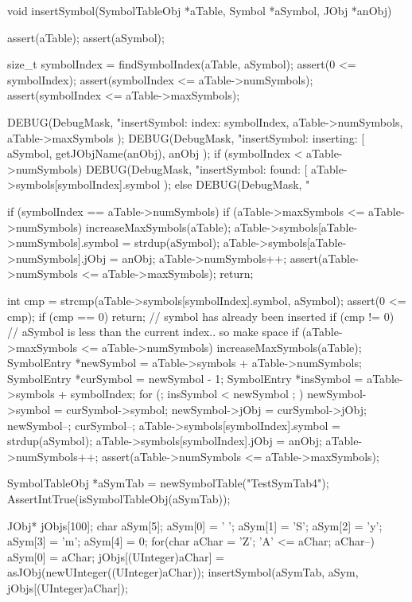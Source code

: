 \startCCode
void insertSymbol(SymbolTableObj *aTable, Symbol *aSymbol, JObj *anObj) {
  assert(aTable);
  assert(aSymbol);
  
  size_t symbolIndex = findSymbolIndex(aTable, aSymbol);
  assert(0 <= symbolIndex);
  assert(symbolIndex <= aTable->numSymbols);
  assert(symbolIndex <= aTable->maxSymbols);
  
  DEBUG(DebugMask,
    "insertSymbol: index: %
    symbolIndex,
    aTable->numSymbols,
    aTable->maxSymbols
  );
  DEBUG(DebugMask,
    "insertSymbol: inserting: [%
    aSymbol,
    getJObjName(anObj),
    anObj
  );
  if (symbolIndex < aTable->numSymbols) {
    DEBUG(DebugMask,
      "insertSymbol: found: [%
      aTable->symbols[symbolIndex].symbol
    );
  } else {
    DEBUG(DebugMask, "%
  }
  
  if (symbolIndex == aTable->numSymbols) {
    if (aTable->maxSymbols <= aTable->numSymbols) increaseMaxSymbols(aTable);
    aTable->symbols[aTable->numSymbols].symbol = strdup(aSymbol);
    aTable->symbols[aTable->numSymbols].jObj   = anObj;
    aTable->numSymbols++;
    assert(aTable->numSymbols <= aTable->maxSymbols);
    return;
  }
  
  int cmp = strcmp(aTable->symbols[symbolIndex].symbol, aSymbol);
  assert(0 <= cmp);
  if (cmp == 0) return; // symbol has already been inserted
  if (cmp != 0) { // aSymbol is less than the current index.. so make space
    if (aTable->maxSymbols <= aTable->numSymbols) increaseMaxSymbols(aTable);
    SymbolEntry *newSymbol = aTable->symbols + aTable->numSymbols;
    SymbolEntry *curSymbol = newSymbol - 1;
    SymbolEntry *insSymbol = aTable->symbols + symbolIndex;
    for (; insSymbol < newSymbol ; ) {
      newSymbol->symbol = curSymbol->symbol;
      newSymbol->jObj   = curSymbol->jObj;
      newSymbol--;
      curSymbol--;
    }
  }
  aTable->symbols[symbolIndex].symbol = strdup(aSymbol);
  aTable->symbols[symbolIndex].jObj   = anObj;
  aTable->numSymbols++;
  assert(aTable->numSymbols <= aTable->maxSymbols);
}
\stopCCode


\startCTest
  SymbolTableObj *aSymTab = newSymbolTable("TestSymTab4");
  AssertIntTrue(isSymbolTableObj(aSymTab));

  JObj* jObjs[100];
  char aSym[5];
  aSym[0] = ' ';
  aSym[1] = 'S';
  aSym[2] = 'y';
  aSym[3] = 'm';
  aSym[4] = 0;
  for(char aChar = 'Z'; 'A' <= aChar; aChar--) {
    aSym[0]      = aChar;
    jObjs[(UInteger)aChar] = asJObj(newUInteger((UInteger)aChar));
    insertSymbol(aSymTab, aSym, jObjs[(UInteger)aChar]);
  }
  
